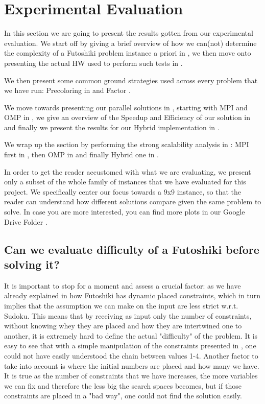 \section{Experimental Evaluation}
\label{sec:evaluation}

In this section we are going to present the results gotten from our experimental evaluation. We start off by giving a brief overview of how we can(not) determine the complexity of a Futoshiki problem instance a priori in , we then move onto presenting the actual HW used to perform such tests in . 

We then present some common ground strategies used across every problem that we have run: Precoloring in  and Factor .

We move towards presenting our parallel solutions in , starting with MPI and OMP in , we give an overview of the Speedup and Efficiency of our solution in  and finally we present the results for our Hybrid implementation in .

We wrap up the section by performing the strong scalability analysis in : MPI first in , then OMP in  and finally Hybrid one in .


In order to get the reader accustomed with what we are evaluating, we present only a subset of the whole family of instances that we have evaluated for this project. We specifically center our focus towards a 9x9 instance, so that the reader can understand how different solutions compare given the same problem to solve. In case you are more interested, you can find more plots in our Google Drive Folder \cite{drive}.


\subsection{Can we evaluate difficulty of a Futoshiki before solving it?}
\label{subsec:futoshiki_difficulty}
It is important to stop for a moment and assess a crucial factor: as we have already explained in  how Futoshiki has dynamic placed constraints, which in turn implies that the assumption we can make on the input are less strict w.r.t. Sudoku. This means that by receiving as input only the number of constraints, without knowing whey they are placed and how they are intertwined one to another, it is extremely hard to define the actual "difficulty" of the problem. It is easy to see that with a simple manipulation of the constraints presented in , one could not have easily understood the chain between values 1-4. Another factor to take into account is where the initial numbers are placed and how many we have. It is true as the number of constraints that we have increases, the more variables we can fix and therefore the less big the search spaces becomes, but if those constraints are placed in a "bad way", one could not find the solution easily.

